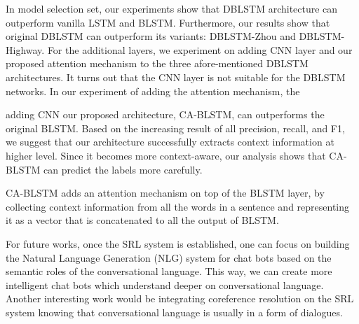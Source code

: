 In model selection set, our experiments show that DBLSTM architecture can outperform vanilla LSTM and BLSTM. Furthermore, our results show that original DBLSTM can outperform its variants: DBLSTM-Zhou and DBLSTM-Highway. For the additional layers, we experiment on adding CNN layer and our proposed attention mechanism to the three afore-mentioned DBLSTM architectures. It turns out that the CNN layer is not suitable for the DBLSTM networks. In our experiment of adding the attention mechanism, the  

adding CNN our proposed architecture, CA-BLSTM, can outperforms the original BLSTM. Based on the increasing result of all precision, recall, and F1, we suggest that our architecture successfully extracts context information at higher level. Since it becomes more context-aware, our analysis shows that CA-BLSTM can predict the labels more carefully.

CA-BLSTM adds an attention mechanism on top of the BLSTM layer, by collecting context information from all the words in a sentence and representing it as a vector that is concatenated to all the output of BLSTM.

For future works, once the SRL system is established, one can focus on building the Natural Language Generation (NLG) system for chat bots based on the semantic roles of the conversational language. This way, we can create more intelligent chat bots which understand deeper on conversational language. Another interesting work would be integrating coreference resolution on the SRL system knowing that conversational language is usually in a form of dialogues.

